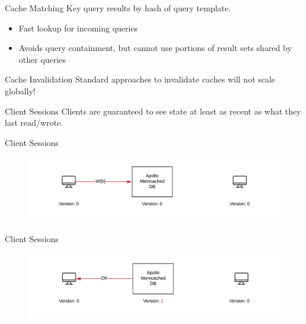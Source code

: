 \documentclass[10pt]{beamer}
\begin{document}
\begin{frame}[fragile]{Cache Matching}
Key query results by \alert{hash of query template}.
\begin{itemize}
    \item{Fast lookup for incoming queries}
    \item{Avoids \alert{query containment}, but cannot use portions of result sets shared by other queries}
\end{itemize}
\end{frame}

\begin{frame}[fragile]{Cache Invalidation}
Standard approaches to invalidate caches will not scale globally!\\
\medskip
{}
\end{frame}

\begin{frame}[fragile]{Client Sessions}
Clients are guaranteed to see state at least as recent as what they last read/wrote.
\end{frame}

\begin{frame}[fragile]{Client Sessions}
    \begin{figure}
        \includegraphics[scale=0.17]{apollo_client_sessions}
    \end{figure}
\end{frame}

\begin{frame}[fragile]{Client Sessions}
    \begin{figure}
        \includegraphics[scale=0.17]{apollo_client_sessions_2}
    \end{figure}
\end{frame}
\end{document}
